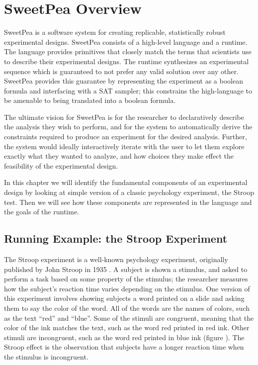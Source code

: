 
\chapter{SweetPea Overview}

SweetPea is a software system for creating replicable, statistically robust experimental designs. SweetPea consists of a high-level language and a runtime. The language provides primitives that closely match the terms that scientists use to describe their experimental designs. The runtime synthesizes an experimental sequence which is guaranteed to not prefer any valid solution over any other. SweetPea provides this guarantee by representing the experiment as a boolean formula and interfacing with a SAT sampler; this constrains the high-language to be amenable to being translated into a boolean formula.

The ultimate vision for SweetPea is for the researcher to declaratively describe the analysis they wish to perform, and for the system to automatically derive the constraints required to produce an experiment for the desired analysis. Further, the system would ideally interactively iterate with the user to let them explore exactly what they wanted to analyze, and how choices they make effect the feasibility of the experimental design.

In this chapter we will identify the fundamental components of an experimental design by looking at simple version of a classic psychology experiment, the Stroop test. Then we will see how these components are represented in the language and the goals of the runtime.

\section{Running Example: the Stroop Experiment}

The Stroop experiment is a well-known psychology experiment, originally published by John Stroop in 1935 \cite{stroop1935studies}. A subject is shown a stimulus, and asked to perform a task based on some property of the stimulus; the researcher measures how the subject's reaction time varies depending on the stimulus. One version of this experiment involves showing subjects a word printed on a slide and asking them to say the color of the word. All of the words are the names of colors, such as the text ``red'' and ``blue''. Some of the stimuli are congruent, meaning that the color of the ink matches the text, such as the word red printed in red ink. Other stimuli are incongruent, such as the word red printed in blue ink (figure ). The Stroop effect is the observation that subjects have a longer reaction time when the stimulus is incongruent.

